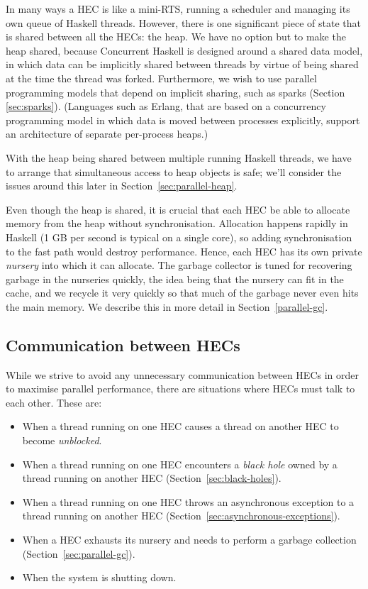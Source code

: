 In many ways a HEC is like a mini-RTS, running a scheduler and
managing its own queue of Haskell threads.  However, there is one
significant piece of state that is shared between all the HECs: the
heap.  We have no option but to make the heap shared, because
Concurrent Haskell is designed around a shared data model, in which
data can be implicitly shared between threads by virtue of being
shared at the time the thread was forked.  Furthermore, we
wish to use parallel programming models that depend on implicit
sharing, such as sparks (Section \ref{sec:sparks}). (Languages such as
Erlang, that are based on a concurrency programming model in which
data is moved between processes explicitly, support an architecture of
separate per-process heaps.)

With the heap being shared between multiple running Haskell threads,
we have to arrange that simultaneous access to heap objects is safe;
we'll consider the issues around this later in
Section~\ref{sec:parallel-heap}.

Even though the heap is shared, it is crucial that each HEC be able to
allocate memory from the heap without synchronisation.  Allocation
happens rapidly in Haskell (1 GB per second is typical on a single
core), so adding synchronisation to the fast path would destroy
performance.  Hence, each HEC has its own private \emph{nursery} into
which it can allocate. The garbage collector is tuned for recovering
garbage in the nurseries quickly, the idea being that the nursery can
fit in the cache, and we recycle it very quickly so that much of the
garbage never even hits the main memory.  We describe this in more
detail in Section~\ref{parallel-gc}.


\subsection{Communication between HECs}

While we strive to avoid any unnecessary communication between HECs in
order to maximise parallel performance, there are situations where
HECs must talk to each other.  These are:

\begin{itemize}
\item When a thread running on one HEC causes a thread on another HEC
  to become \emph{unblocked}.
\item When a thread running on one HEC encounters a \emph{black hole}
  owned by a thread running on another HEC
  (Section~\ref{sec:black-holes}).
\item When a thread running on one HEC throws an asynchronous
  exception to a thread running on another HEC
  (Section~\ref{sec:asynchronous-exceptions}).
\item When a HEC exhausts its nursery and needs to perform a garbage
  collection (Section~\ref{sec:parallel-gc}).
\item When the system is shutting down.
\end{itemize}

